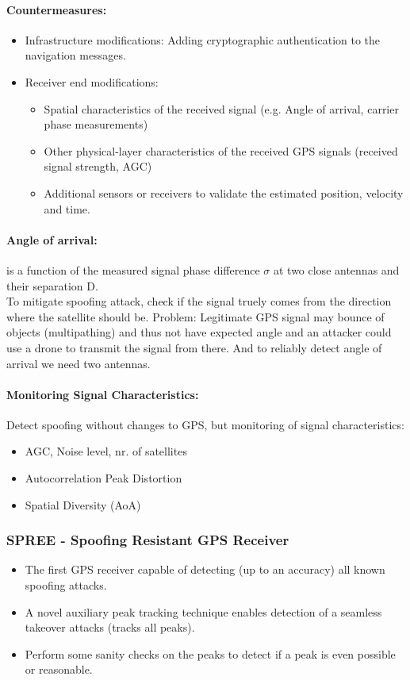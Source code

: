 \paragraph{Countermeasures:} 
\begin{itemize}
    \item Infrastructure modifications: Adding cryptographic authentication to the navigation messages.
    \item Receiver end modifications:
    \begin{itemize}
        \item Spatial characteristics of the received signal (e.g. Angle of arrival, carrier phase measurements)
        \item Other physical-layer characteristics of the received GPS signals (received signal strength, AGC)
        \item Additional sensors or receivers to validate the estimated position, velocity and time.
    \end{itemize}
\end{itemize}

\paragraph{Angle of arrival:} is a function of the measured signal phase difference $\sigma$ at two close antennas and their separation D. 
\\
To mitigate spoofing attack, check if the signal truely comes from the direction where the satellite should be. Problem: Legitimate GPS signal may bounce of objects (multipathing) and thus not have expected angle and an attacker could use a drone to transmit the signal from there. And to reliably detect angle of arrival we need two antennas.

\paragraph{Monitoring Signal Characteristics:} Detect spoofing without changes to GPS, but monitoring of signal characteristics:
\begin{itemize}
    \item AGC, Noise level, nr. of satellites
    \item Autocorrelation Peak Distortion
    \item Spatial Diversity (AoA)
\end{itemize}

\subsubsection{SPREE - Spoofing Resistant GPS Receiver}
\begin{itemize}
    \item The first GPS receiver capable of detecting (up to an accuracy) all known spoofing attacks.
    \item A novel auxiliary peak tracking technique enables detection of a seamless takeover attacks (tracks all peaks).
    \item Perform some sanity checks on the peaks to detect if a peak is even possible or reasonable.
\end{itemize}

